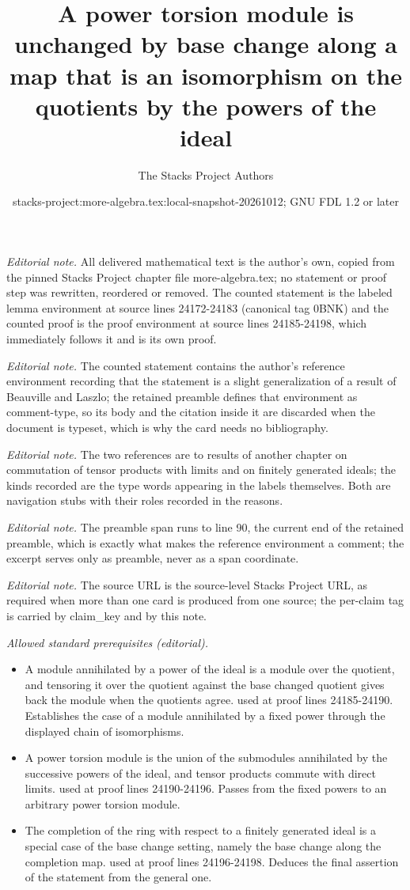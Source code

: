 \documentclass[10pt,a4paper]{amsart}
\title{A power torsion module is unchanged by base change along a map that is an isomorphism on the quotients by the powers of the ideal}
\author{The Stacks Project Authors}
\date{stacks-project:more-algebra.tex:local-snapshot-20261012; GNU FDL 1.2 or later}
\theoremstyle{plain}
\theoremstyle{definition}
\theoremstyle{remark}
\numberwithin{equation}{subsection}
\begin{document}
\maketitle
\setcounter{subsection}{1}
\noindent\textit{Editorial note.} All delivered mathematical text is the author's own, copied from the pinned Stacks Project chapter file more-algebra.tex; no statement or proof step was rewritten, reordered or removed. The counted statement is the labeled lemma environment at source lines 24172-24183 (canonical tag 0BNK) and the counted proof is the proof environment at source lines 24185-24198, which immediately follows it and is its own proof.\par\medskip
\noindent\textit{Editorial note.} The counted statement contains the author's reference environment recording that the statement is a slight generalization of a result of Beauville and Laszlo; the retained preamble defines that environment as comment-type, so its body and the citation inside it are discarded when the document is typeset, which is why the card needs no bibliography.\par\medskip
\noindent\textit{Editorial note.} The two references are to results of another chapter on commutation of tensor products with limits and on finitely generated ideals; the kinds recorded are the type words appearing in the labels themselves. Both are navigation stubs with their roles recorded in the reasons.\par\medskip
\noindent\textit{Editorial note.} The preamble span runs to line 90, the current end of the retained preamble, which is exactly what makes the reference environment a comment; the excerpt serves only as preamble, never as a span coordinate.\par\medskip
\noindent\textit{Editorial note.} The source URL is the source-level Stacks Project URL, as required when more than one card is produced from one source; the per-claim tag is carried by claim\_key and by this note.\par\medskip
\noindent\textit{Allowed standard prerequisites (editorial).}\begin{itemize}
\item A module annihilated by a power of the ideal is a module over the quotient, and tensoring it over the quotient against the base changed quotient gives back the module when the quotients agree. used at proof lines 24185-24190. Establishes the case of a module annihilated by a fixed power through the displayed chain of isomorphisms.
\item A power torsion module is the union of the submodules annihilated by the successive powers of the ideal, and tensor products commute with direct limits. used at proof lines 24190-24196. Passes from the fixed powers to an arbitrary power torsion module.
\item The completion of the ring with respect to a finitely generated ideal is a special case of the base change setting, namely the base change along the completion map. used at proof lines 24196-24198. Deduces the final assertion of the statement from the general one.
\end{itemize}\medskip
\end{document}
